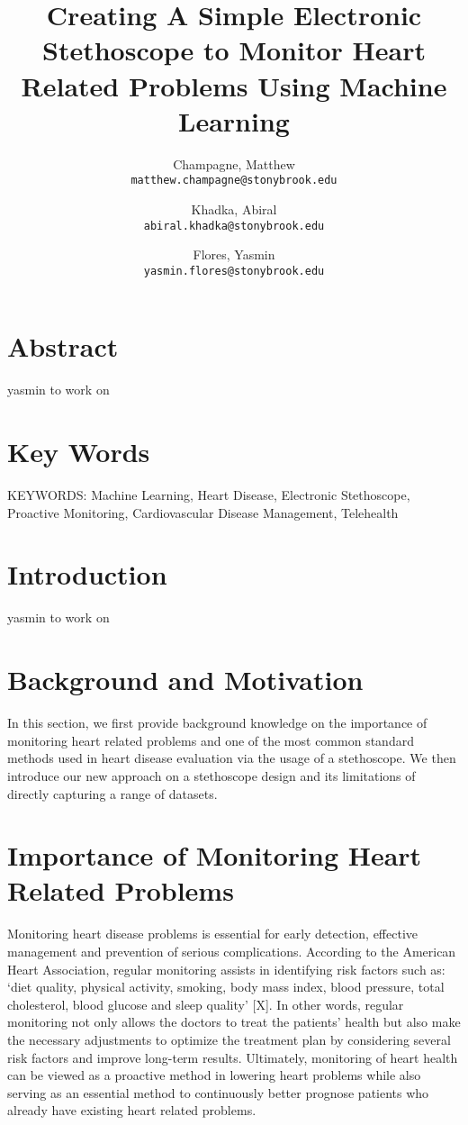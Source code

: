 \documentclass[twocolumn]{article}
\begin{document}
\title{Creating A Simple Electronic Stethoscope to Monitor Heart Related Problems Using Machine Learning}
\author{
  Champagne, Matthew \\
  \texttt{matthew.champagne@stonybrook.edu}
  \and
  Khadka, Abiral \\
  \texttt{abiral.khadka@stonybrook.edu}
  \and
  Flores, Yasmin \\
  \texttt{yasmin.flores@stonybrook.edu}
}

\maketitle
\section{Abstract} 
yasmin to work on 

\section{Key Words} 
KEYWORDS: Machine Learning, Heart Disease, Electronic Stethoscope, Proactive Monitoring, Cardiovascular Disease Management, Telehealth 

\section{Introduction}
yasmin to work on 

\section{Background and Motivation} 
In this section, we first provide background knowledge on the importance of monitoring heart related problems 
and one of the most common standard methods used in heart disease evaluation via the usage 
of a stethoscope. We then introduce our new approach on a stethoscope design and its limitations 
of directly capturing a range of datasets.

\section{Importance of Monitoring Heart Related Problems} 
Monitoring heart disease problems is essential for early detection, effective management and prevention of serious complications. 
According to the American Heart Association, regular monitoring assists in identifying risk factors such as: 
‘diet quality, physical activity, smoking, body mass index, blood pressure, total cholesterol, blood glucose and sleep quality’ [X]. 
In other words, regular monitoring not only allows the doctors to treat the patients’ health 
but also make the necessary adjustments to optimize the treatment plan by considering several risk factors 
and improve long-term results. Ultimately, monitoring of heart health can be viewed as a proactive method 
in lowering heart problems while also serving as an essential method to continuously better prognose patients 
who already have existing heart related problems. 
\end{document}
